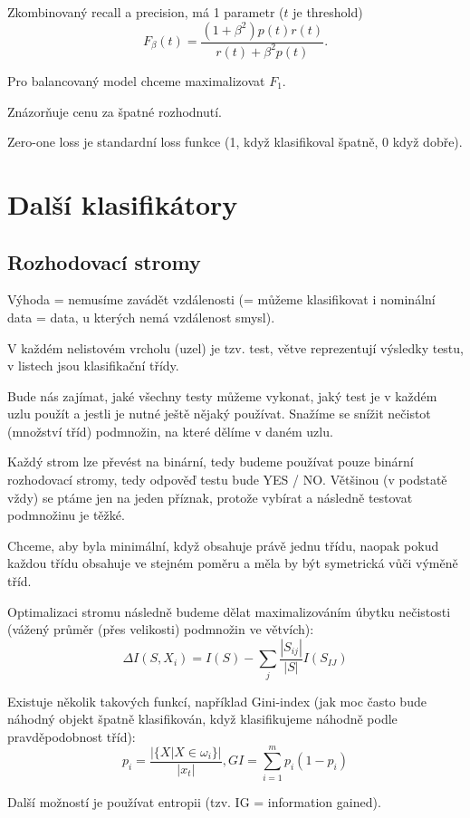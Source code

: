 \documentclass[12pt]{article}					%
\begin{document}
    \begin{definice}[F skore]
        Zkombinovaný recall a precision, má 1 parametr ($t$ je threshold)
        $$ F_\beta (t) = \frac{(1+\beta^2)p(t)r(t)}{r(t)+\beta^2p(t)}. $$

        Pro balancovaný model chceme maximalizovat $F_1$.
    \end{definice}

    \begin{definice}
        Znázorňuje cenu za špatné rozhodnutí.

        Zero-one loss je standardní loss funkce (1, když klasifikoval špatně, 0 když dobře).

    \end{definice}


\section{Další klasifikátory}
    \subsection{Rozhodovací stromy}
    \begin{definice}
        Výhoda = nemusíme zavádět vzdálenosti (= můžeme klasifikovat i nominální data = data, u kterých nemá vzdálenost smysl).

        V každém nelistovém vrcholu (uzel) je tzv. test, větve reprezentují výsledky testu, v listech jsou klasifikační třídy.

        Bude nás zajímat, jaké všechny testy můžeme vykonat, jaký test je v každém uzlu použít a jestli je nutné ještě nějaký používat. Snažíme se snížit nečistot (množství tříd) podmnožin, na které dělíme v daném uzlu.

        Každý strom lze převést na binární, tedy budeme používat pouze binární rozhodovací stromy, tedy odpověď testu bude YES / NO. Většinou (v podstatě vždy) se ptáme jen na jeden příznak, protože vybírat a následně testovat podmnožinu je těžké.
    \end{definice}

    \begin{definice}
        Chceme, aby byla minimální, když obsahuje právě jednu třídu, naopak pokud každou třídu obsahuje ve stejném poměru a měla by být symetrická vůči výměně tříd.

        Optimalizaci stromu následně budeme dělat maximalizováním úbytku nečistosti (vážený průměr (přes velikosti) podmnožin ve větvích):
        $$ \Delta I(S, X_i) = I(S) - \sum_j \frac{|S_{ij}|}{|S|}I(S_{IJ}) $$ 

        Existuje několik takových funkcí, například Gini-index (jak moc často bude náhodný objekt špatně klasifikován, když klasifikujeme náhodně podle pravděpodobnost tříd):
        $$ p_i = \frac{|\{X|X \in \omega_i\}|}{|x_t|}, GI = \sum_{i = 1}^m p_i (1-p_i) $$

        Další možností je používat entropii (tzv. IG = information gained).
    \end{definice}
\end{document}
